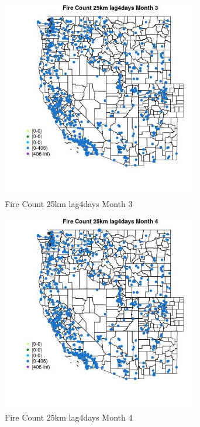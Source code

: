 \begin{figure} 
\centering  
\includegraphics[width=0.77\textwidth]{Code_Outputs/Report_ML_input_PM25_Step4_part_f_de_duplicated_aveswNAs_MapObsMo3Fire_Count_25km_lag4days.jpg} 
\caption{\label{fig:Report_ML_input_PM25_Step4_part_f_de_duplicated_aveswNAsMapObsMo3Fire_Count_25km_lag4days}Fire Count 25km lag4days Month 3} 
\end{figure} 
 

\begin{figure} 
\centering  
\includegraphics[width=0.77\textwidth]{Code_Outputs/Report_ML_input_PM25_Step4_part_f_de_duplicated_aveswNAs_MapObsMo4Fire_Count_25km_lag4days.jpg} 
\caption{\label{fig:Report_ML_input_PM25_Step4_part_f_de_duplicated_aveswNAsMapObsMo4Fire_Count_25km_lag4days}Fire Count 25km lag4days Month 4} 
\end{figure} 
 

